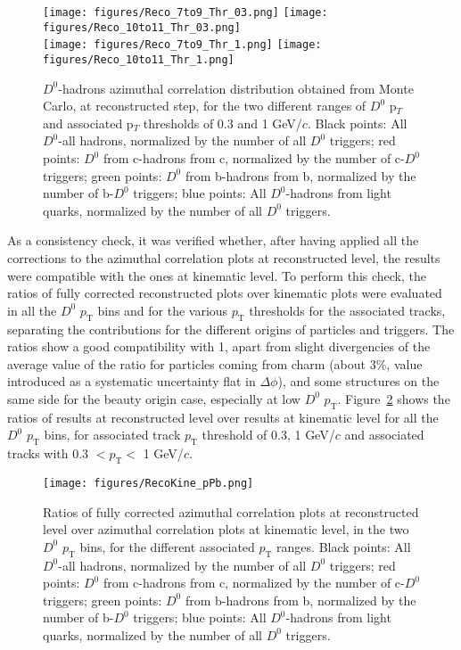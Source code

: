 \begin{figure}
{\texttt{[image: figures/Reco\_7to9\_Thr\_03.png]}}
{\texttt{[image: figures/Reco\_10to11\_Thr\_03.png]}} \\
{\texttt{[image: figures/Reco\_7to9\_Thr\_1.png]}}
{\texttt{[image: figures/Reco\_10to11\_Thr\_1.png]}}
\caption{$D^0$-hadrons azimuthal correlation distribution obtained from Monte Carlo, at reconstructed step, for the two different ranges of $D^0$ p$_T$ and associated p$_T$ thresholds of 0.3 and 1 GeV/$c$. Black points: All $D^0$-all hadrons, normalized by the number of all $D^0$ triggers; red points: $D^0$ from c-hadrons from c, normalized by the number of c-$D^0$ triggers; green points: $D^0$ from b-hadrons from b, normalized by the number of b-$D^0$ triggers; blue points: All $D^0$-hadrons from light quarks, normalized by the number of all $D^0$ triggers.}
\label{fig:MC_Reco}
\end{figure}

As a consistency check, it was verified whether, after having applied all the corrections to the azimuthal correlation plots at reconstructed level, the results were compatible with the ones at kinematic level. To perform this check, the ratios of fully corrected reconstructed plots over kinematic plots were evaluated in all the $D^0$ $p_\text{T}$ bins and for the various $p_\text{T}$ thresholds for the associated tracks, separating the contributions for the different origins of particles and triggers. The ratios show a good compatibility with 1, apart from slight divergencies of the average value of the ratio for particles coming from charm (about 3\%, value introduced as a systematic uncertainty flat in $\Delta\phi$), and some structures on the same side for the beauty origin case, especially at low $D^0$ $p_\text{T}$. Figure~\ref{fig:MC_Ratios} shows the ratios of results at reconstructed level over results at kinematic level for all the $D^0$ $p_\text{T}$ bins, for associated track $p_\text{T}$ threshold of 0.3, 1 GeV/$c$ and associated tracks with 0.3 $< p_\text{T} < $ 1 GeV/$c$.

\begin{figure}
\centering
{\texttt{[image: figures/RecoKine\_pPb.png]}}
\caption{Ratios of fully corrected azimuthal correlation plots at reconstructed level over azimuthal correlation plots at kinematic level, in the two $D^0$ $p_\text{T}$ bins, for the different associated $p_\text{T}$ ranges. Black points: All $D^0$-all hadrons, normalized by the number of all $D^0$ triggers; red points: $D^0$ from c-hadrons from c, normalized by the number of c-$D^0$ triggers; green points: $D^0$ from b-hadrons from b, normalized by the number of b-$D^0$ triggers; blue points: All $D^0$-hadrons from light quarks, normalized by the number of all $D^0$ triggers.}
\label{fig:MC_Ratios}
\end{figure}

